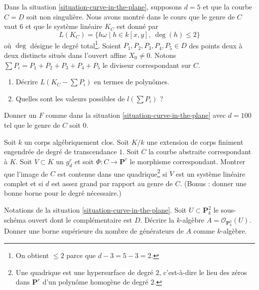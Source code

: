 \begin{exercise}
\label{exercise-smooth-plane-curve-linear-system}
Dans la situation \ref{situation-curve-in-the-plane}, supposons $d = 5$
et que la courbe $C = D$ soit non singulière. Nous avons montré dans le cours
que le genre de $C$ vaut $6$ et que le système linéaire $K_C$ est donné par
$$
L(K_C) = \{h\omega \mid h \in k[x, y],\ \deg(h) \leq 2\}
$$
où $\deg$ désigne le degré total\footnote{On obtient $\leq 2$ parce que
$d - 3 = 5 - 3 = 2$.}. Soient $P_1, P_2, P_3, P_4, P_5 \in D$
des points deux à deux distincts situés dans l'ouvert affine $X_0 \not = 0$. Notons
$\sum P_i = P_1 + P_2 + P_3 + P_4 + P_5$ le diviseur correspondant sur $C$.
\begin{enumerate}
\item Décrire $L(K_C - \sum P_i)$ en termes de polynômes.
\item Quelles sont les valeurs possibles de $l(\sum P_i)$ ?
\end{enumerate}
\end{exercise}

\begin{exercise}
\label{exercise-rational-curve-high-degree}
Donner un $F$ comme dans la situation \ref{situation-curve-in-the-plane}
avec $d = 100$ tel que le genre de $C$ soit $0$.
\end{exercise}

\begin{exercise}
\label{exercise-high-degree-curve-quadratic-equation}
Soit $k$ un corps algébriquement clos. Soit $K/k$ une extension de corps
finiment engendrée de degré de transcendance $1$.
Soit $C$ la courbe abstraite correspondant à $K$.
Soit $V \subset K$ un $g^r_d$ et soit $\Phi : C \to \mathbf{P}^r$
le morphisme correspondant. Montrer que l'image de $C$
est contenue dans une quadrique\footnote{Une quadrique est une hypersurface de degré $2$,
c'est-à-dire le lieu des zéros dans $\mathbf{P}^r$ d'un polynôme homogène
de degré $2$.} si $V$ est un système linéaire complet
et si $d$ est assez grand par rapport au genre de $C$.
(Bonus : donner une bonne borne pour le degré nécessaire.)
\end{exercise}

\begin{exercise}
\label{exercise-surjective-map-a2-p2}
Notations de la situation \ref{situation-curve-in-the-plane}.
Soit $U \subset \mathbf{P}^2_k$ le sous-schéma ouvert
dont le complémentaire est $D$. Décrire la $k$-algèbre
$A = \mathcal{O}_{\mathbf{P}^2_k}(U)$. Donner une borne supérieure du
nombre de générateurs de $A$ comme $k$-algèbre.
\end{exercise}



